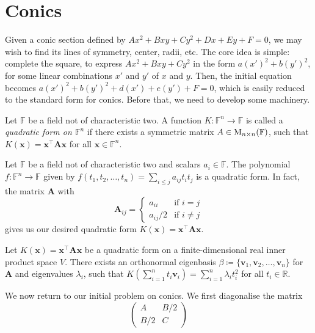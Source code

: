 \section{Conics}
Given a conic section defined by \(Ax^2+Bxy+Cy^2+Dx+Ey+F=0\), we may wish to find its lines of symmetry, center, radii, etc. The core idea is simple: complete the square, to express \(Ax^2+Bxy+Cy^2\) in the form \(a(x')^2+b(y')^2\), for some linear combinations \(x'\) and \(y'\) of \(x\) and \(y\). Then, the initial equation becomes \(a(x')^2+b(y')^2+d(x')+e(y')+F=0\), which is easily reduced to the standard form for conics. Before that, we need to develop some machinery.
\begin{definition}{}{}
    Let \(\mathbb{F}\) be a field not of characteristic two. A function \(K\colon \mathbb{F}^n\to \mathbb{F}\) is called a \emph{quadratic form on \(\mathbb{F}^n\)} if there exists a symmetric matrix \(A\in\operatorname{M}_{n \times n}(\mathbb{F})\), such that \(K(\mathbf{x})=\mathbf{x}^{\top} \mathbf{A}\mathbf{x}\) for all \(\mathbf{x}\in \mathbb{F}^n\).
\end{definition}
\begin{note}
    Let \(\mathbb{F}\) be a field not of characteristic two and scalars \(a_i\in \mathbb{F}\). The polynomial \(f\colon \mathbb{F}^n\to \mathbb{F}\) given by \(f(t_1,t_2,\dots,t_n)=\sum_{i\leq j}{a_{ij}t_it_j}\) is a quadratic form. In fact, the matrix \(\mathbf{A}\) with 
    \[\mathbf{A}_{ij}=
    \begin{cases}
        a_{ii} &\text{if }i=j\\
        a_{ij}/2 &\text{if }i\neq j
    \end{cases}\]
    gives us our desired quadratic form \(K(\mathbf{x})=\mathbf{x}^{\top}\mathbf{A}\mathbf{x}\).
\end{note}
\begin{theorem}{}{}
    \hypertarget{thm:quadratic-forms-real}{}
    Let \(K(\mathbf{x})=\mathbf{x}^{\top} \mathbf{A}\mathbf{x}\) be a quadratic form on a finite-dimensional real inner product space \(V\). There exists an orthonormal eigenbasis \(\beta\coloneq\{\mathbf{v}_1,\mathbf{v}_2,\dots,\mathbf{v}_n\}\) for \(\mathbf{A}\) and eigenvalues \(\lambda_i\), such that \(K\left( \sum_{i=1}^{n}{t_i \mathbf{v}_i} \right)=\sum_{i=1}^{n}{\lambda_it_i^2}\) for all \(t_i\in \mathbb{R}\).
\end{theorem}
We now return to our initial problem on conics. We first diagonalise the matrix 
\[\begin{pmatrix}
    A & B/2\\
    B/2 & C
\end{pmatrix}\]
